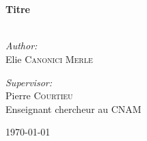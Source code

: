 \begin{titlepage}


\begin{center}

\textsc{\Large }\\[0.5cm]

\HRule \\[0.4cm]

{\huge \bfseries Titre\\
}
\HRule \\[1.5cm]
\vfill
\begin{minipage}{0.4\textwidth}
\begin{flushleft} \large
\emph{Author:}\\
Elie \textsc{Canonici Merle}
\end{flushleft}
\end{minipage}
\begin{minipage}{0.4\textwidth}
\begin{flushright} \large
\emph{Supervisor:} \\
Pierre \textsc{Courtieu}\\
Enseignant chercheur au \textsc{CNAM}
\end{flushright}
\end{minipage}

\vfill

{\large \today}

\end{center}
\end{titlepage}
